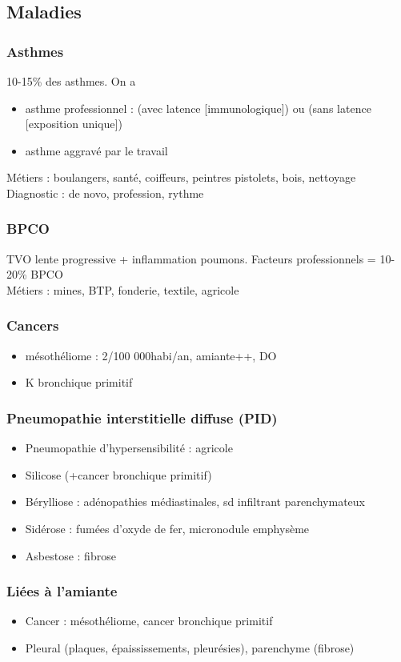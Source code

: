 \subsection{Maladies}
\subsubsection{Asthmes}
10-15\% des asthmes. On a
\begin{itemize}
\item asthme professionnel : (avec latence [immunologique]) ou (sans latence
  [exposition unique])
\item asthme aggravé par le travail
\end{itemize}
Métiers : boulangers, santé, coiffeurs, peintres pistolets, bois, nettoyage\\
Diagnostic : de novo, profession, rythme
\subsubsection{BPCO}
\gls{TVO} lente progressive + inflammation
poumons. Facteurs professionnels = 10-20\% BPCO\\
Métiers : mines, BTP, fonderie, textile, agricole
\subsubsection{Cancers}
\begin{itemize}
\item mésothéliome : 2/100 000habi/an, amiante++, DO
\item K bronchique primitif
\end{itemize}
\subsubsection{Pneumopathie interstitielle diffuse (PID)}
\begin{itemize}
\item Pneumopathie d'hypersensibilité : agricole
\item Silicose (+cancer bronchique primitif)
\item Bérylliose : adénopathies médiastinales, sd infiltrant parenchymateux
\item Sidérose : fumées d'oxyde de fer, micronodule \textpm{} emphysème
\item Asbestose : fibrose
\end{itemize}
\subsubsection{Liées à l'amiante}
\begin{itemize}
\item Cancer : mésothéliome, cancer bronchique primitif
\item Pleural (plaques, épaississements, pleurésies), parenchyme (fibrose)
\end{itemize}
